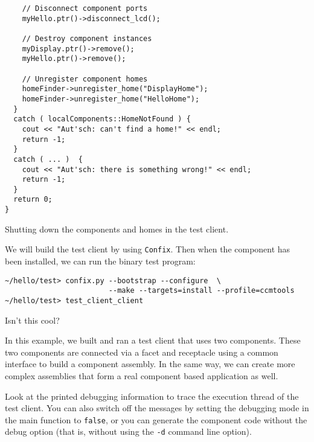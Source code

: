 \begin{Example}
\begin{minifbox}
\begin{small}
\begin{verbatim}
    // Disconnect component ports
    myHello.ptr()->disconnect_lcd();

    // Destroy component instances
    myDisplay.ptr()->remove();
    myHello.ptr()->remove();

    // Unregister component homes
    homeFinder->unregister_home("DisplayHome");
    homeFinder->unregister_home("HelloHome");
  }
  catch ( localComponents::HomeNotFound ) {
    cout << "Aut'sch: can't find a home!" << endl;
    return -1;
  }
  catch ( ... )  {
    cout << "Aut'sch: there is something wrong!" << endl;
    return -1;
  }
  return 0;
}
\end{verbatim}
\end{small}
\end{minifbox}
\caption{Shutting down the components and homes in the test client.}
\label{example:two-components-teardown}
\end{Example}

We will build the test client by using {\tt Confix}. Then when the component has
been installed, we can run the binary test program:
\begin{verbatim}
~/hello/test> confix.py --bootstrap --configure  \
                        --make --targets=install --profile=ccmtools
~/hello/test> test_client_client
\end{verbatim}

Isn't this cool?

In this example, we built and ran a test client that uses two components. These
two components are connected via a facet and receptacle using a common interface
to build a component assembly. In the same way, we can create more complex
assemblies that form a real component based application as well.

Look at the printed debugging information to trace the execution thread of the
test client. You can also switch off the messages by setting the debugging mode
in the main function to {\tt false}, or you can generate the component code
without the debug option (that is, without using the {\tt -d} command line
option).
